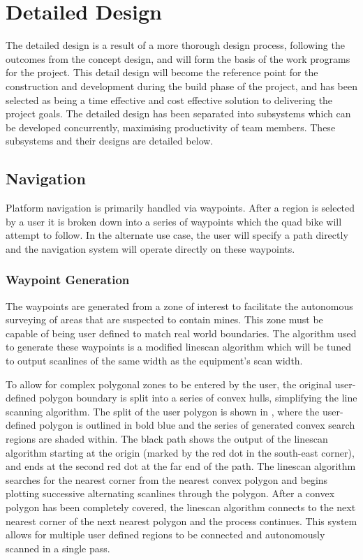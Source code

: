 \documentclass[main.tex]{subfiles}
\begin{document}
\chapter{Detailed Design}
The detailed design is a result of a more thorough design process, following the outcomes from the concept design, and will form the basis of the work programs for the project. This detail design will become the reference point for the construction and development during the build phase of the project, and has been selected as being a time effective and cost effective solution to delivering the project goals. The detailed design has been separated into subsystems which can be developed concurrently, maximising productivity of team members. These subsystems and their designs are detailed below.

\section{Navigation}
Platform navigation is primarily handled via waypoints. After a region is selected by a user it
is broken down into a series of waypoints which the quad bike will attempt to follow. In the
alternate use case, the user will specify a path directly and the navigation system will operate
directly on these waypoints.
\subsection{Waypoint Generation}
The waypoints are generated from a zone of interest to facilitate the autonomous surveying of areas that are suspected to contain mines. This zone must be capable of being user defined to match real world boundaries. The algorithm used to generate these waypoints is a modified linescan algorithm which will be tuned to output scanlines of the same width as the equipment's scan width.

To allow for complex polygonal zones to be entered by the user, the original user-defined polygon boundary is split into a series of convex hulls, simplifying the line scanning algorithm. The split of the user polygon is shown in , where the user-defined polygon is outlined in bold blue and the series of generated convex search regions are shaded within. The black path shows the output of the linescan algorithm starting at the origin (marked by the red dot in the south-east corner), and ends at the second red dot at the far end of the path. The linescan algorithm searches for the nearest corner from the nearest convex polygon and begins plotting successive alternating scanlines through the polygon. After a convex polygon has been completely covered, the linescan algorithm connects to the next nearest corner of the next nearest polygon and the process continues. This system allows for multiple user defined regions to be connected and autonomously scanned in a single pass.
\end{document}
